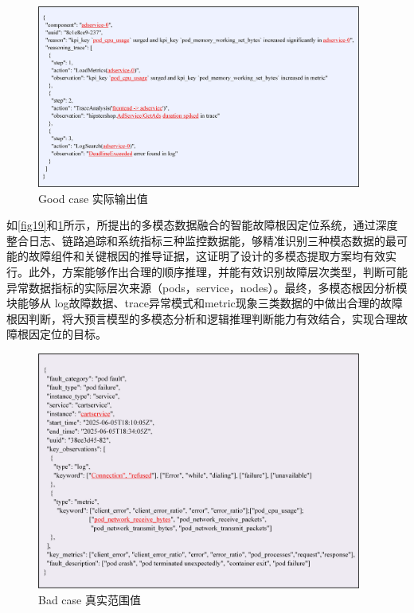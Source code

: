 \documentclass[11pt]{article}
\begin{document}
\begin{figure}[htbp]
    \centering
    \includegraphics[width=0.95\textwidth]{pics/fig20.png}
    \caption{Good case 实际输出值}
    \label{fig20}
\end{figure}

如\ref{fig19}和\ref{fig20}所示，所提出的多模态数据融合的智能故障根因定位系统，通过深度整合日志、链路追踪和系统指标三种监控数据能，够精准识别三种模态数据的最可能的故障组件和关键根因的推导证据，这证明了设计的多模态提取方案均有效实行。此外，方案能够作出合理的顺序推理，并能有效识别故障层次类型，判断可能异常数据指标的实际层次来源（pods，service，nodes）。最终，多模态根因分析模块能够从 log故障数据、trace异常模式和metric现象三类数据的中做出合理的故障根因判断，将大预言模型的多模态分析和逻辑推理判断能力有效结合，实现合理故障根因定位的目标。

\begin{figure}[htbp]
    \centering
    \includegraphics[width=0.95\textwidth]{pics/fig21.png}
    \caption{Bad case 真实范围值}
    \label{fig21}
\end{figure}
\end{document}

